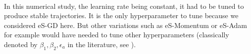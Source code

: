 \documentclass[article,authoryear,jmlmc]{beg_32}             %
\begin{document}


\ \\
In this numerical study, the learning rate being constant, it had to be tuned to produce stable trajectories. 
It is the only hyperparameter to tune because we considered eS-GD here. 
But other variations such as eS-Momentum or eS-Adam for example would have needed to tune other hyperparameters (classically denoted by $\beta_1,\beta_2, \epsilon_a$ in the literature, see
\cite{Bilel_thesis}). %
\end{document}
